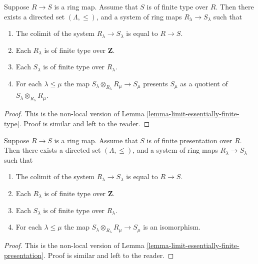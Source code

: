 \begin{lemma}
\label{lemma-limit-finite-type}
Suppose $R \to S$ is a ring map.
Assume that $S$ is of finite type over $R$.
Then there exists a directed set $(\Lambda, \leq)$, and
a system of ring maps $R_\lambda \to S_\lambda$
such that
\begin{enumerate}
\item The colimit of the system $R_\lambda \to S_\lambda$
is equal to $R \to S$.
\item Each $R_\lambda$ is of finite type
over $\mathbf{Z}$.
\item Each $S_\lambda$ is of finite type
over $R_\lambda$.
\item For each $\lambda \leq \mu$ the map
$S_\lambda \otimes_{R_\lambda} R_\mu \to S_\mu$
presents $S_\mu$ as a quotient
of $S_\lambda \otimes_{R_\lambda} R_\mu$.
\end{enumerate}
\end{lemma}

\begin{proof}
This is the non-local version of
Lemma \ref{lemma-limit-essentially-finite-type}.
Proof is similar and left to the reader.
\end{proof}

\begin{lemma}
\label{lemma-limit-finite-presentation}
Suppose $R \to S$ is a ring map.
Assume that $S$ is of finite presentation over $R$.
Then there exists a directed set $(\Lambda, \leq)$, and
a system of ring maps $R_\lambda \to S_\lambda$
such that
\begin{enumerate}
\item The colimit of the system $R_\lambda \to S_\lambda$
is equal to $R \to S$.
\item Each $R_\lambda$ is of finite type
over $\mathbf{Z}$.
\item Each $S_\lambda$ is of finite type
over $R_\lambda$.
\item For each $\lambda \leq \mu$ the map
$S_\lambda \otimes_{R_\lambda} R_\mu \to S_\mu$
is an isomorphism.
\end{enumerate}
\end{lemma}

\begin{proof}
This is the non-local version of
Lemma \ref{lemma-limit-essentially-finite-presentation}.
Proof is similar and left to the reader.
\end{proof}

